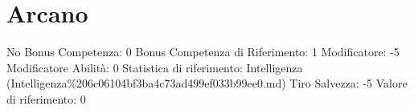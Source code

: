\section{Arcano}\label{arcano}

\begin{description}
\tightlist
\item[Tags: ABI]
No Bonus Competenza: 0 Bonus Competenza di Riferimento: 1 Modificatore:
-5 Modificatore Abilità: 0 Statistica di riferimento: Intelligenza
(Intelligenza\%206c06104bf3ba4c73ad499ef033b99ee0.md) Tiro Salvezza: -5
Valore di riferimento: 0
\end{description}
